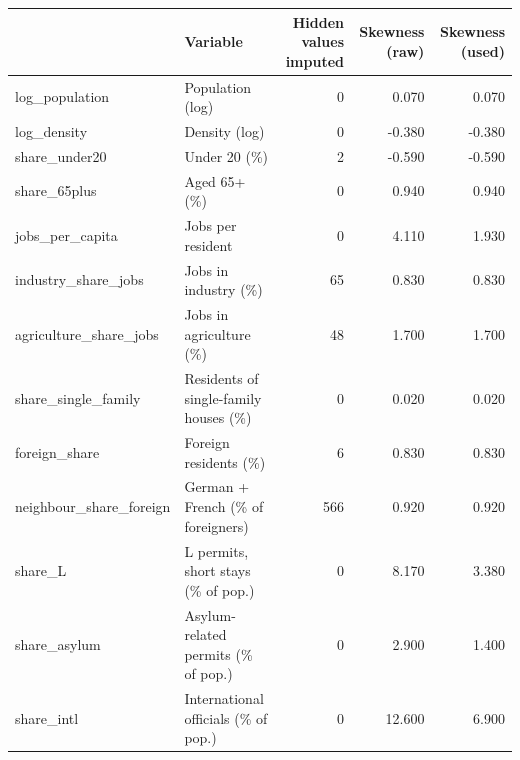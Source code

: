 \begin{tabular}{llrrr}
\toprule
 & Variable & Hidden values imputed & Skewness (raw) & Skewness (used) \\
\midrule
log\_population & Population (log) & 0 & 0.070 & 0.070 \\
log\_density & Density (log) & 0 & -0.380 & -0.380 \\
share\_under20 & Under 20 (\%) & 2 & -0.590 & -0.590 \\
share\_65plus & Aged 65+ (\%) & 0 & 0.940 & 0.940 \\
jobs\_per\_capita & Jobs per resident & 0 & 4.110 & 1.930 \\
industry\_share\_jobs & Jobs in industry (\%) & 65 & 0.830 & 0.830 \\
agriculture\_share\_jobs & Jobs in agriculture (\%) & 48 & 1.700 & 1.700 \\
share\_single\_family & Residents of single-family houses (\%) & 0 & 0.020 & 0.020 \\
foreign\_share & Foreign residents (\%) & 6 & 0.830 & 0.830 \\
neighbour\_share\_foreign & German + French (\% of foreigners) & 566 & 0.920 & 0.920 \\
share\_L & L permits, short stays (\% of pop.) & 0 & 8.170 & 3.380 \\
share\_asylum & Asylum-related permits (\% of pop.) & 0 & 2.900 & 1.400 \\
share\_intl & International officials (\% of pop.) & 0 & 12.600 & 6.900 \\
\bottomrule
\end{tabular}
